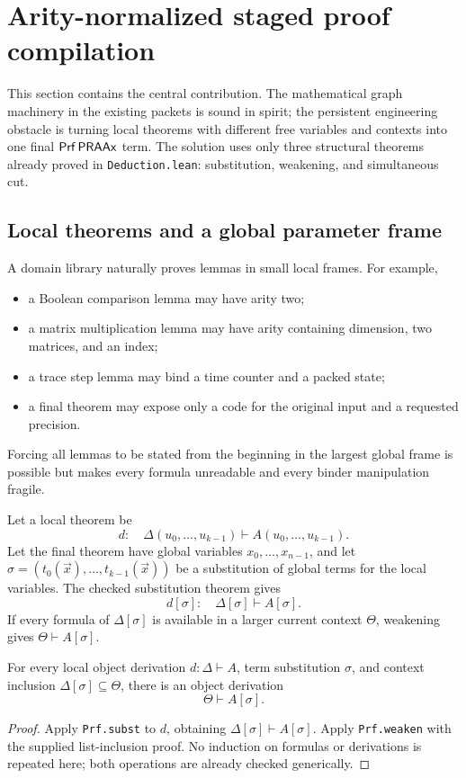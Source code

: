 \section{Arity-normalized staged proof compilation}
\label{sec:compiler}

This section contains the central contribution.  The mathematical graph machinery in the existing packets
is sound in spirit; the persistent engineering obstacle is turning local theorems with different free
variables and contexts into one final \(\mathsf{Prf}\,\mathsf{PRAAx}\) term.  The solution uses only three structural
theorems already proved in \texttt{Deduction.lean}: substitution, weakening, and simultaneous cut.

\subsection{Local theorems and a global parameter frame}

A domain library naturally proves lemmas in small local frames.  For example,
\begin{itemize}
  \item a Boolean comparison lemma may have arity two;
  \item a matrix multiplication lemma may have arity containing dimension, two matrices, and an index;
  \item a trace step lemma may bind a time counter and a packed state;
  \item a final theorem may expose only a code for the original input and a requested precision.
\end{itemize}
Forcing all lemmas to be stated from the beginning in the largest global frame is possible but makes every
formula unreadable and every binder manipulation fragile.

Let a local theorem be
\[
  d:\quad \Delta(u_0,\ldots,u_{k-1})\vdash A(u_0,\ldots,u_{k-1}).
\]
Let the final theorem have global variables \(x_0,\ldots,x_{n-1}\), and let
\(\sigma=(t_0(\vec x),\ldots,t_{k-1}(\vec x))\) be a substitution of global terms for the local variables.
The checked substitution theorem gives
\[
  d[\sigma]:\quad \Delta[\sigma]\vdash A[\sigma].
\]
If every formula of \(\Delta[\sigma]\) is available in a larger current context \(\Theta\), weakening gives
\(\Theta\vdash A[\sigma]\).

\begin{lemma}
\label{lem:instantiate-into}
For every local object derivation \(d:\Delta\vdash A\), term substitution \(\sigma\), and context
inclusion \(\Delta[\sigma]\subseteq\Theta\), there is an object derivation
\[
  \Theta\vdash A[\sigma].
\]
\end{lemma}
\begin{proof}
Apply \texttt{Prf.subst} to \(d\), obtaining
\(\Delta[\sigma]\vdash A[\sigma]\).  Apply \texttt{Prf.weaken} with the supplied list-inclusion proof.
No induction on formulas or derivations is repeated here; both operations are already checked generically.
\end{proof}

